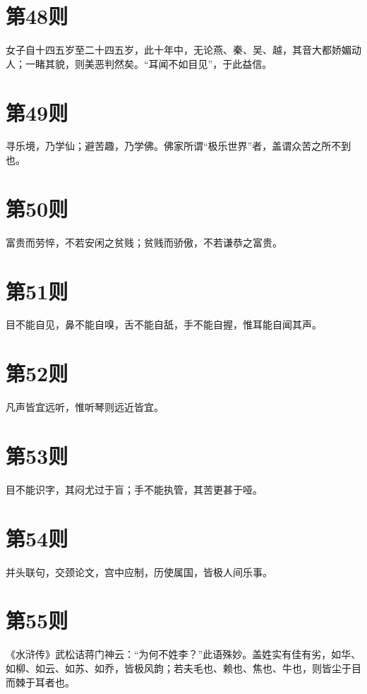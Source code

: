 \documentclass[12pt,a4paper]{ctexbook}
\begin{document}
\section{第48则}
女子自十四五岁至二十四五岁，此十年中，无论燕、秦、吴、越，其音大都娇媚动人；一睹其貌，则美恶判然矣。“耳闻不如目见”，于此益信。\par

\section{第49则}
寻乐境，乃学仙；避苦趣，乃学佛。佛家所谓“极乐世界”者，盖谓众苦之所不到也。\par

\section{第50则}
富贵而劳悴，不若安闲之贫贱；贫贱而骄傲，不若谦恭之富贵。\par

\section{第51则}
目不能自见，鼻不能自嗅，舌不能自舐，手不能自握，惟耳能自闻其声。\par

\section{第52则}
凡声皆宜远听，惟听琴则远近皆宜。\par

\section{第53则}
目不能识字，其闷尤过于盲；手不能执管，其苦更甚于哑。\par

\section{第54则}
并头联句，交颈论文，宫中应制，历使属国，皆极人间乐事。\par

\section{第55则}
《水浒传》武松诘蒋门神云：“为何不姓李？”此语殊妙。盖姓实有佳有劣，如华、如柳、如云、如苏、如乔，皆极风韵；若夫毛也、赖也、焦也、牛也，则皆尘于目而棘于耳者也。\par
\end{document}
